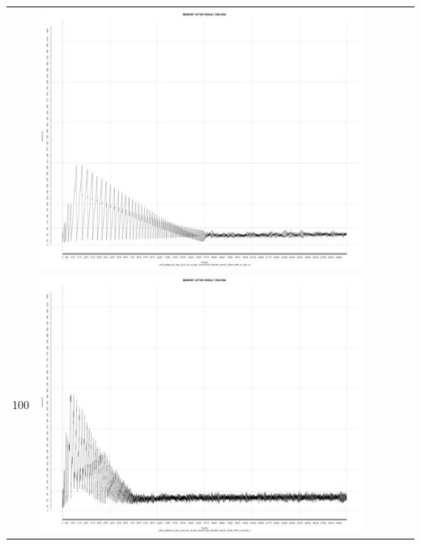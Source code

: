 \begin{table}[htbp]
{\begin{tabular}{l | ccccc}
\begin{minipage}{.15\textwidth}
    				\end{minipage}
    			   & \begin{minipage}{.15\textwidth}
     			 	\includegraphics[width=\linewidth]{images/mema-triple/N6}
    				 \end{minipage}\\		
		100	   & \begin{minipage}{.15\textwidth}
     			 	\includegraphics[width=\linewidth]{images/mema-triple/N3}
    				 \end{minipage}
    			   & \begin{minipage}{.15\textwidth}

\end{minipage}
\end{tabular}}
\end{table}
